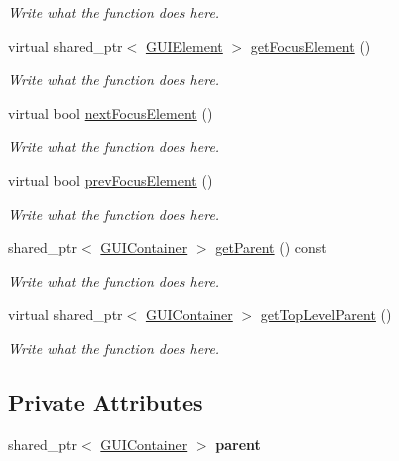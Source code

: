\begin{DoxyCompactItemize}
\begin{DoxyCompactList}\small\item\em Write what the function does here. \end{DoxyCompactList}\item 
virtual shared\+\_\+ptr$<$ \hyperlink{classGUIElement}{G\+U\+I\+Element} $>$ \hyperlink{classGUIElement_acdb491fec728f3a39318850fa144c766}{get\+Focus\+Element} ()
\begin{DoxyCompactList}\small\item\em Write what the function does here. \end{DoxyCompactList}\item 
virtual bool \hyperlink{classGUIElement_a72dffcca76f328b780c346369d7cf325}{next\+Focus\+Element} ()
\begin{DoxyCompactList}\small\item\em Write what the function does here. \end{DoxyCompactList}\item 
virtual bool \hyperlink{classGUIElement_a970e90bbb7db5de07708b0b2ef53d9e9}{prev\+Focus\+Element} ()
\begin{DoxyCompactList}\small\item\em Write what the function does here. \end{DoxyCompactList}\item 
shared\+\_\+ptr$<$ \hyperlink{classGUIContainer}{G\+U\+I\+Container} $>$ \hyperlink{classGUIElement_aded5837705c097a7a8a755df28c572e6}{get\+Parent} () const 
\begin{DoxyCompactList}\small\item\em Write what the function does here. \end{DoxyCompactList}\item 
virtual shared\+\_\+ptr$<$ \hyperlink{classGUIContainer}{G\+U\+I\+Container} $>$ \hyperlink{classGUIElement_a09eebb7ff9e98191caf3a0421f0bad8c}{get\+Top\+Level\+Parent} ()
\begin{DoxyCompactList}\small\item\em Write what the function does here. \end{DoxyCompactList}\end{DoxyCompactItemize}
\subsection*{Private Attributes}
\begin{DoxyCompactItemize}
\item 
\hypertarget{classGUIElement_a2fb7d617ff3fa7ef323cd8231e962a5a}{shared\+\_\+ptr$<$ \hyperlink{classGUIContainer}{G\+U\+I\+Container} $>$ {\bfseries parent}}\label{classGUIElement_a2fb7d617ff3fa7ef323cd8231e962a5a}

\end{DoxyCompactItemize}


